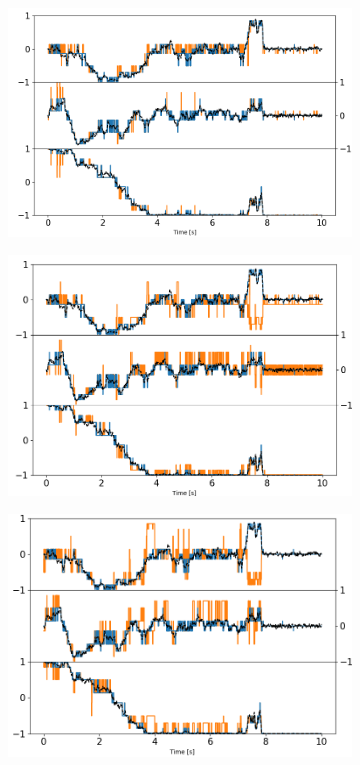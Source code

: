 \documentclass[final,  3p]{elsarticle}
\begin{document}
\begin{figure}[h]
	\centering
	\begin{subfigure}{0.31\textwidth}
		\subcaption{}
		\includegraphics[width =\textwidth]{./Images/fig9a.png}
	\end{subfigure}
	\begin{subfigure}{0.31\textwidth}
		\subcaption{}
		\includegraphics[width=\textwidth]{./Images/fig9b.png}
	\end{subfigure}
	\begin{subfigure}{0.31\textwidth}
		\subcaption{}
		\includegraphics[width=\textwidth]{./Images/fig9c.png}

\end{subfigure}
\end{figure}
\end{document}
